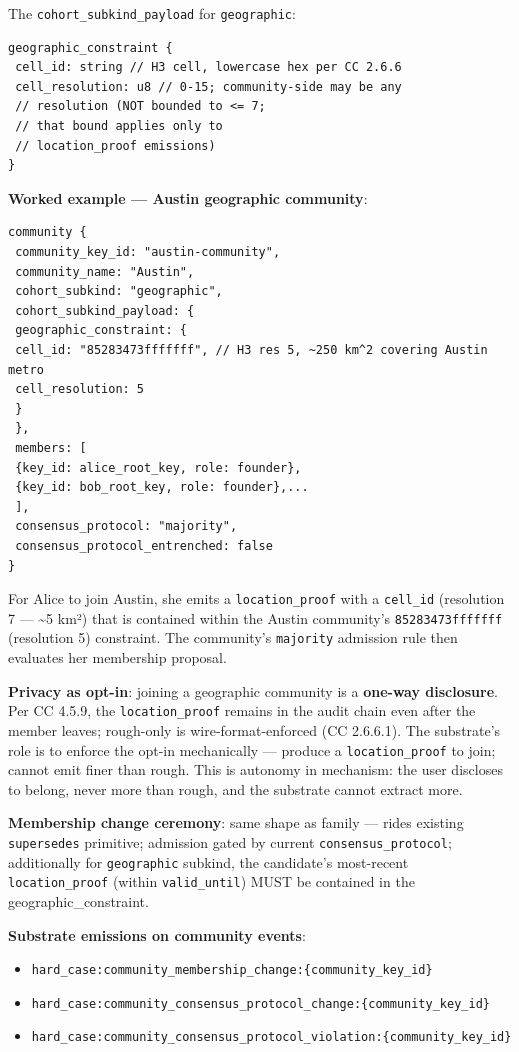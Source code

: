 \documentclass[11pt]{article}
\begin{document}
The \texttt{cohort\_subkind\_payload} for \texttt{geographic}:


\begin{lstlisting}
geographic_constraint {
 cell_id: string // H3 cell, lowercase hex per CC 2.6.6
 cell_resolution: u8 // 0-15; community-side may be any
 // resolution (NOT bounded to <= 7;
 // that bound applies only to
 // location_proof emissions)
}
\end{lstlisting}

\textbf{Worked example — Austin geographic community}:


\begin{lstlisting}
community {
 community_key_id: "austin-community",
 community_name: "Austin",
 cohort_subkind: "geographic",
 cohort_subkind_payload: {
 geographic_constraint: {
 cell_id: "85283473fffffff", // H3 res 5, ~250 km^2 covering Austin metro
 cell_resolution: 5
 }
 },
 members: [
 {key_id: alice_root_key, role: founder},
 {key_id: bob_root_key, role: founder},...
 ],
 consensus_protocol: "majority",
 consensus_protocol_entrenched: false
}
\end{lstlisting}

For Alice to join Austin, she emits a \texttt{location\_proof} with a \texttt{cell\_id} (resolution 7 — \textasciitilde{}5 km²) that is contained within the Austin community's \texttt{85283473fffffff} (resolution 5) constraint. The community's \texttt{majority} admission rule then evaluates her membership proposal.


\textbf{Privacy as opt-in}: joining a geographic community is a \textbf{one-way disclosure}. Per CC 4.5.9, the \texttt{location\_proof} remains in the audit chain even after the member leaves; rough-only is wire-format-enforced (CC 2.6.6.1). The substrate's role is to enforce the opt-in mechanically — produce a \texttt{location\_proof} to join; cannot emit finer than rough. This is autonomy in mechanism: the user discloses to belong, never more than rough, and the substrate cannot extract more.


\textbf{Membership change ceremony}: same shape as family — rides existing \texttt{supersedes} primitive; admission gated by current \texttt{consensus\_protocol}; additionally for \texttt{geographic} subkind, the candidate's most-recent \texttt{location\_proof} (within \texttt{valid\_until}) MUST be contained in the geographic\_constraint.


\textbf{Substrate emissions on community events}:

\begin{itemize}\setlength\itemsep{0pt}
\item \texttt{hard\_case:community\_membership\_change:\{community\_key\_id\}}
\item \texttt{hard\_case:community\_consensus\_protocol\_change:\{community\_key\_id\}}
\item \texttt{hard\_case:community\_consensus\_protocol\_violation:\{community\_key\_id\}}
\end{itemize}
\end{document}
